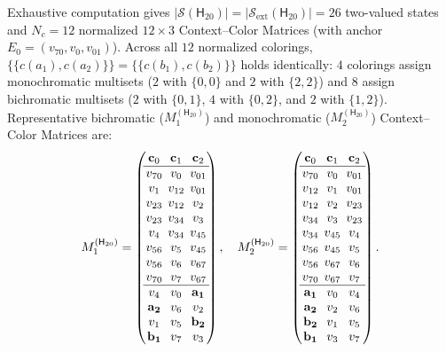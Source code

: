 \documentclass[aps,pra,reprint,superscriptaddress,longbibliography,nofootinbib,floatfix,10pt]{revtex4-2}
\theoremstyle{definition}\newtheorem{definition}[theorem]{Definition}
\theoremstyle{remark}\newtheorem{remark}[theorem]{Remark}
\newcommand{\Sc}{\mathcal S}\newcommand{\Cc}{\mathcal C}\newcommand{\Wc}{\mathcal W}
\newcommand{\Htwenty}{\mathsf H_{20}}
\begin{document}
Exhaustive computation gives $|\Sc(\Htwenty)|=|\Sc_{\mathrm{ext}}(\Htwenty)|=26$ two-valued states and $N_c=12$ normalized $12\times 3$ Context--Color Matrices (with anchor $E_0=(v_{70},v_0,v_{01})$). Across all $12$ normalized colorings, $\{\!\{c(a_1),c(a_2)\}\!\}=\{\!\{c(b_1),c(b_2)\}\!\}$ holds identically: $4$ colorings assign monochromatic multisets ($2$ with $\{0,0\}$ and $2$ with $\{2,2\}$) and $8$ assign bichromatic multisets ($2$ with $\{0,1\}$, $4$ with $\{0,2\}$, and $2$ with $\{1,2\}$). Representative bichromatic ($M_1^{(\Htwenty)}$) and monochromatic ($M_2^{(\Htwenty)}$) Context--Color Matrices are:
\begin{equation}\label{eq:octagon-matrices}
\setlength{\arraycolsep}{2.2pt}
M_1^{(\Htwenty)}=\begin{pmatrix}
\mathbf{c}_0&\mathbf{c}_1&\mathbf{c}_2\\\hline
v_{70}&v_0&v_{01}\\
v_1&v_{12}&v_{01}\\
v_{23}&v_{12}&v_2\\
v_{23}&v_{34}&v_3\\
v_4&v_{34}&v_{45}\\
v_{56}&v_5&v_{45}\\
v_{56}&v_6&v_{67}\\
v_{70}&v_7&v_{67}\\\hline
v_4&v_0&\mathbf{a_1}\\
\mathbf{a_2}&v_6&v_2\\
v_1&v_5&\mathbf{b_2}\\
\mathbf{b_1}&v_7&v_3
\end{pmatrix},\quad
M_2^{(\Htwenty)}=\begin{pmatrix}
\mathbf{c}_0&\mathbf{c}_1&\mathbf{c}_2\\\hline
v_{70}&v_0&v_{01}\\
v_{12}&v_1&v_{01}\\
v_{12}&v_2&v_{23}\\
v_{34}&v_3&v_{23}\\
v_{34}&v_{45}&v_4\\
v_{56}&v_{45}&v_5\\
v_{56}&v_{67}&v_6\\
v_{70}&v_{67}&v_7\\\hline
\mathbf{a_1}&v_0&v_4\\
\mathbf{a_2}&v_2&v_6\\
\mathbf{b_2}&v_1&v_5\\
\mathbf{b_1}&v_3&v_7
\end{pmatrix}.
\end{equation}
\end{document}
